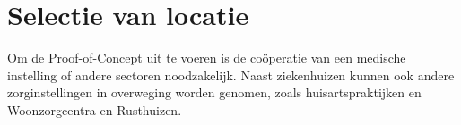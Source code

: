 


\section{Selectie van locatie}
Om de Proof-of-Concept uit te voeren is de coöperatie van een medische instelling of andere sectoren noodzakelijk. Naast ziekenhuizen kunnen ook andere zorginstellingen in overweging worden genomen, zoals huisartspraktijken en Woonzorgcentra en Rusthuizen. %

